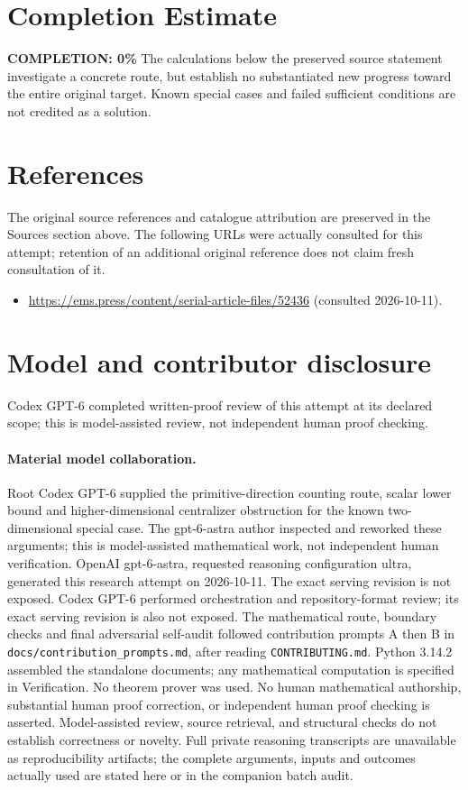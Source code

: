 \documentclass[11pt]{article}
\begin{document}
\section{Completion Estimate}
\noindent\textbf{COMPLETION: 0\%}
The calculations below the preserved source statement investigate a concrete route,
but establish no substantiated new progress toward the entire original target.
Known special cases and failed sufficient conditions are not credited as a solution.
\section{References}
The original source references and catalogue attribution are preserved in the
Sources section above. The following URLs were actually consulted for this attempt;
retention of an additional original reference does not claim fresh consultation of it.
\begin{itemize}
\item \url{https://ems.press/content/serial-article-files/52436} (consulted 2026-10-11). 
\end{itemize}
\section{Model and contributor disclosure}
Codex GPT-6 completed written-proof review of this attempt at its declared scope; this is model-assisted review, not independent human proof checking.
\paragraph{Material model collaboration.} Root Codex GPT-6 supplied the primitive-direction counting route, scalar lower bound and higher-dimensional centralizer obstruction for the known two-dimensional special case. The gpt-6-astra author inspected and reworked these arguments; this is model-assisted mathematical work, not independent human verification.
OpenAI gpt-6-astra, requested reasoning configuration ultra, generated this research
attempt on 2026-10-11. The exact serving revision is not exposed. Codex GPT-6
performed orchestration and repository-format review; its exact serving revision
is also not exposed. The mathematical route, boundary checks and final adversarial
self-audit followed contribution prompts A then B in
\texttt{docs/contribution\_prompts.md}, after reading \texttt{CONTRIBUTING.md}.
Python 3.14.2 assembled the standalone documents; any mathematical computation is
specified in Verification. No theorem prover was used. No human mathematical
authorship, substantial human proof correction, or independent human proof checking
is asserted. Model-assisted review, source retrieval, and structural checks do not
establish correctness or novelty. Full private reasoning transcripts are unavailable
as reproducibility artifacts; the complete arguments, inputs and outcomes actually
used are stated here or in the companion batch audit.
\end{document}
